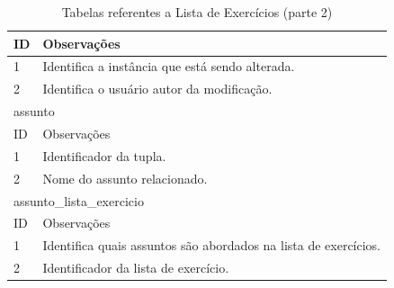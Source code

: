 \documentclass[graduacao,brazil]{ThesisPUC}
\begin{document}
\begin{table}[H]
{\begin{tabular}{|l|l|}
    ID                      & Observações                                                                                           \\ \hline
    1                       & Identifica a instância que está sendo alterada.                                                       \\ \hline
    2                       & Identifica o usuário autor da modificação.                                                            \\ \hline
    \multicolumn{2}{|l|}{assunto} \\ \hline
    ID                      & Observações                                                                                           \\ \hline
    1                       & Identificador da tupla.                                                                               \\ \hline
    2                       & Nome do assunto relacionado.                                                                          \\ \hline
    \multicolumn{2}{|l|}{assunto\_lista\_exercicio} \\ \hline
    ID                      & Observações                                                                                           \\ \hline
    1                       & Identifica quais assuntos são abordados na lista de exercícios.                                       \\ \hline
    2                       & Identificador da lista de exercício.                                                                  \\ \hline
    \end{tabular}
    }
    \caption {Tabelas referentes a Lista de Exerc\'{i}cios (parte 2)}
\end{table}

\end{document}
